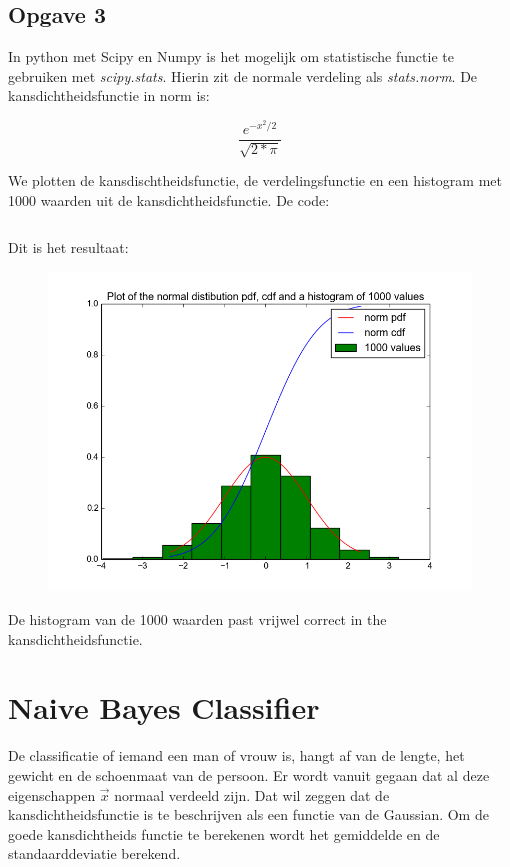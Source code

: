 \documentclass[a4paper,12px]{article}
\begin{document}
\subsection{Opgave 3}

    In python met Scipy en Numpy is het mogelijk om statistische functie te
     gebruiken met \textit{scipy.stats}. Hierin zit de normale verdeling als
     \textit{stats.norm}. De kansdichtheidsfunctie in norm is:

    \begin{equation}
        \dfrac{e^{-x^2/2}}{\sqrt{2*\pi}}
    \end{equation}

    We plotten de kansdischtheidsfunctie, de verdelingsfunctie en een histogram
     met 1000 waarden uit de kansdichtheidsfunctie. De code:
    \inputminted{python}{3.py}
    Dit is het resultaat:

    \begin{figure}[!h]
        \centering
        \includegraphics[width=\textwidth]{fig.png}
    \end{figure}
    \FloatBarrier

    De histogram van de 1000 waarden past vrijwel correct in the
    kansdichtheidsfunctie.

\clearpage
\section{Naive Bayes Classifier}

De classificatie of iemand een man of vrouw is, hangt af van de lengte, het
gewicht en de schoenmaat van de persoon. Er wordt vanuit gegaan dat al deze
eigenschappen $\vec x$ normaal verdeeld zijn. Dat wil zeggen dat de kansdichtheidsfunctie
is te beschrijven als een functie van de Gaussian. Om de goede kansdichtheids
functie te berekenen wordt het gemiddelde en de standaarddeviatie berekend.
\end{document}
